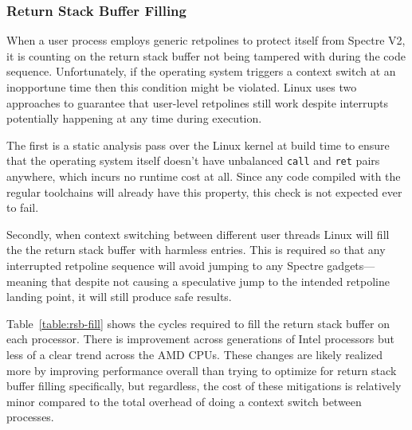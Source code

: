 \subsubsection{Return Stack Buffer Filling}

When a user process employs generic retpolines to protect itself from Spectre V2, it is counting on the return stack buffer not being tampered with during the code sequence.
Unfortunately, if the operating system triggers a context switch at an inopportune time then this condition might be violated.
Linux uses two approaches to guarantee that user-level retpolines still work despite interrupts potentially happening at any time during execution.

The first is a static analysis pass over the Linux kernel at build time to ensure that the operating system itself doesn't have  unbalanced \texttt{call} and \texttt{ret} pairs anywhere, which incurs no runtime cost at all.
Since any code compiled with the regular toolchains will already have this property, this check is not expected ever to fail.

Secondly, when context switching between different user threads Linux will fill the the return stack buffer with harmless entries.
This is required so that any interrupted retpoline sequence will avoid jumping to any Spectre gadgets---meaning that despite not causing a speculative jump to the intended retpoline landing point, it will still produce safe results.

Table~\ref{table:rsb-fill} shows the cycles required to fill the return stack buffer on each processor.
There is improvement across generations of Intel processors but less of a clear trend across the AMD CPUs.
These changes are likely realized more by improving performance overall
than trying to optimize for return stack buffer filling specifically, but regardless, the cost of these mitigations is relatively minor compared to the total overhead of doing a context switch between processes.

